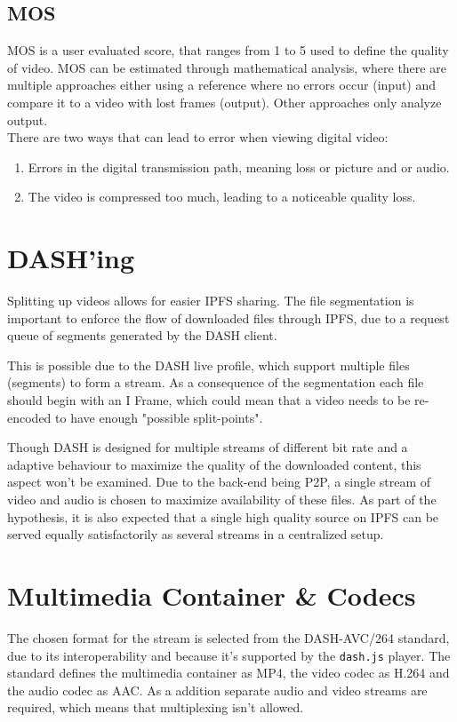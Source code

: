 \subsection{\acl{MOS}}
\ac{MOS} is a user evaluated score, that ranges from 1 to 5 used to define the quality of video. \ac{MOS} can be estimated through mathematical analysis, where there are multiple approaches either using a reference where no errors occur (input) and compare it to a video with lost frames (output). Other approaches only analyze output.\\
There are two ways that can lead to error when viewing digital video:
\begin{enumerate}
    \item Errors in the digital transmission path, meaning loss or picture and or audio.
    \item The video is compressed too much, leading to a noticeable quality loss.
\end{enumerate}


\section{DASH'ing}
Splitting up videos allows for easier \ac{IPFS} sharing. The file segmentation is important to enforce the flow of downloaded files through IPFS, due to a request queue of segments generated by the \ac{DASH} client.

This is possible due to the \ac{DASH} live profile, which support multiple files (segments) to form a stream. As a consequence of the segmentation each file should begin with an I Frame, which could mean that a video needs to be re-encoded to have enough "possible split-points".

Though \ac{DASH} is designed for multiple streams of different bit rate and a adaptive behaviour to maximize the quality of the downloaded content, this aspect won't be examined. Due to the back-end being \ac{P2P}, a single stream of video and audio is chosen to maximize availability of these files. As part of the hypothesis, it is also expected that a single high quality source on \ac{IPFS} can be served equally satisfactorily as several streams in a centralized setup.

\section{Multimedia Container \& Codecs}
\label{sec:video-encoding}
The chosen format for the stream is selected from the DASH-AVC/264 standard\cite{dash264}, due to its interoperability and because it's supported by the \texttt{dash.js} player.
The standard defines the multimedia container as MP4, the video codec as H.264 and the audio codec as AAC. As a addition separate audio and video streams are required, which means that multiplexing isn't allowed.



